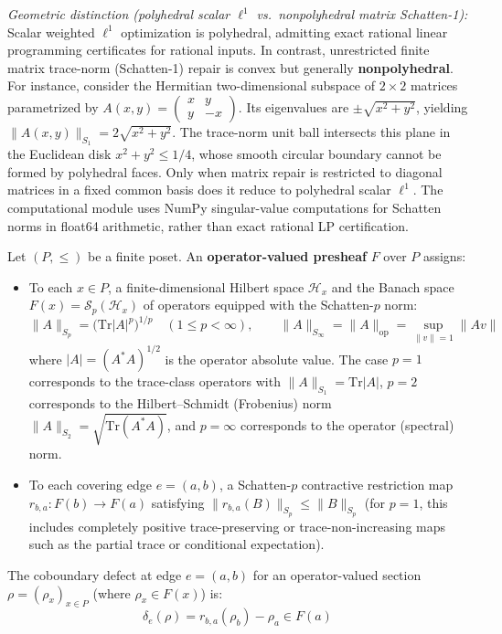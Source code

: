 \documentclass[
]{article}
\providecommand{\tightlist}{%
  \setlength{\itemsep}{0pt}\setlength{\parskip}{0pt}}
\providecommand{\tightlist}{%
  \setlength{\itemsep}{0pt}\setlength{\parskip}{0pt}}
\begin{document}
\emph{Geometric distinction (polyhedral scalar \(\ell^1\) vs.~nonpolyhedral matrix Schatten-1):} Scalar weighted \(\ell^1\) optimization is polyhedral, admitting exact rational linear programming certificates for rational inputs. In contrast, unrestricted finite matrix trace-norm (Schatten-1) repair is convex but generally \textbf{nonpolyhedral}. For instance, consider the Hermitian two-dimensional subspace of \(2 \times 2\) matrices parametrized by \(A(x,y) = \begin{pmatrix} x & y \\ y & -x \end{pmatrix}\). Its eigenvalues are \(\pm\sqrt{x^2+y^2}\), yielding \(\|A(x,y)\|_{S_1} = 2\sqrt{x^2+y^2}\). The trace-norm unit ball intersects this plane in the Euclidean disk \(x^2+y^2 \le 1/4\), whose smooth circular boundary cannot be formed by polyhedral faces. Only when matrix repair is restricted to diagonal matrices in a fixed common basis does it reduce to polyhedral scalar \(\ell^1\). The computational module uses NumPy singular-value computations for Schatten norms in float64 arithmetic, rather than exact rational LP certification.

Let \((P, \leq)\) be a finite poset. An \textbf{operator-valued presheaf} \(F\) over \(P\) assigns:

\begin{itemize}
\tightlist
\item
  To each \(x \in P\), a finite-dimensional Hilbert space \(\mathcal{H}_x\) and the Banach space \(F(x) = \mathcal{S}_p(\mathcal{H}_x)\) of operators equipped with the Schatten-\(p\) norm:
  \[\|A\|_{S_p} = \Big(\mathrm{Tr}|A|^p\Big)^{1/p} \quad (1 \le p < \infty), \qquad \|A\|_{S_\infty} = \|A\|_{\mathrm{op}} = \sup_{\|v\|=1} \|Av\|\]
  where \(|A| = (A^*A)^{1/2}\) is the operator absolute value. The case \(p=1\) corresponds to the trace-class operators with \(\|A\|_{S_1} = \mathrm{Tr}|A|\), \(p=2\) corresponds to the Hilbert--Schmidt (Frobenius) norm \(\|A\|_{S_2} = \sqrt{\mathrm{Tr}(A^*A)}\), and \(p=\infty\) corresponds to the operator (spectral) norm.
\item
  To each covering edge \(e = (a, b)\), a Schatten-\(p\) contractive restriction map \(r_{b,a}: F(b) \to F(a)\) satisfying \(\|r_{b,a}(B)\|_{S_p} \le \|B\|_{S_p}\) (for \(p=1\), this includes completely positive trace-preserving or trace-non-increasing maps such as the partial trace or conditional expectation).
\end{itemize}

The coboundary defect at edge \(e = (a, b)\) for an operator-valued section \(\rho = (\rho_x)_{x \in P}\) (where \(\rho_x \in F(x)\)) is:
\[\delta_e(\rho) = r_{b,a}(\rho_b) - \rho_a \in F(a)\]
\end{document}
